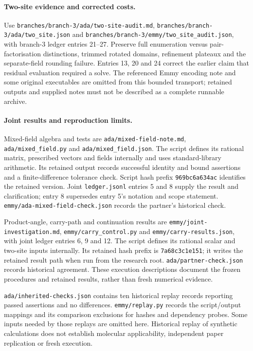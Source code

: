 \documentclass{article}
\begin{document}
\paragraph{Two-site evidence and corrected costs.}
Use \texttt{branches/branch-3/ada/two-site-audit.md}, \texttt{branches/branch-3/ada/two\_site.json} and \texttt{branches/branch-3/emmy/two\_site\_audit.json}, with branch-3 ledger entries 21--27. Preserve full enumeration versus pair-factorisation distinctions, trimmed rotated domains, refinement plateaux and the separate-field rounding failure. Entries 13, 20 and 24 correct the earlier claim that residual evaluation required a solve. The referenced Emmy encoding note and some original executables are omitted from this bounded transport; retained outputs and supplied notes must not be described as a complete runnable archive.

\paragraph{Joint results and reproduction limits.}
Mixed-field algebra and tests are \texttt{ada/mixed-field-note.md}, \texttt{ada/mixed\_field.py} and \texttt{ada/mixed\_field.json}. The script defines its rational matrix, prescribed vectors and fields internally and uses standard-library arithmetic. Its retained output records successful identity and bound assertions and a finite-difference tolerance check. Script hash prefix \texttt{969bc6a634ac} identifies the retained version. Joint \texttt{ledger.jsonl} entries 5 and 8 supply the result and clarification; entry 8 supersedes entry 5's notation and scope statement. \texttt{emmy/ada-mixed-field-check.json} records the partner's historical check.

Product-angle, carry-path and continuation results are \texttt{emmy/joint-investigation.md}, \texttt{emmy/carry\_control.py} and \texttt{emmy/carry-results.json}, with joint ledger entries 6, 9 and 12. The script defines its rational scalar and two-site inputs internally. Its retained hash prefix is \texttt{7a68c3c1e151}; it writes the retained result path when run from the research root. \texttt{ada/partner-check.json} records historical agreement. These execution descriptions document the frozen procedures and retained results, rather than fresh numerical evidence.

\texttt{ada/inherited-checks.json} contains ten historical replay records reporting passed assertions and no differences. \texttt{emmy/replay.py} records the script/output mappings and its comparison exclusions for hashes and dependency probes. Some inputs needed by those replays are omitted here. Historical replay of synthetic calculations does not establish molecular applicability, independent paper replication or fresh execution.
\end{document}
